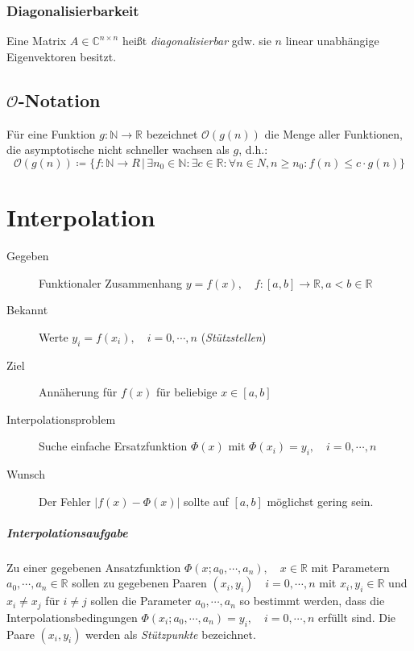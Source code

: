 \documentclass[a4paper, 11pt, accentcolor = tud3b]{tudreport}
\newcommand{\forwhich}{\ensuremath{{\,\vert\,}}}
\newcommand{\abs}[1]{\ensuremath{{\lvert #1 \rvert}}}
\newcommand{\C}{\ensuremath{\mathbb{C}}}
\newcommand{\R}{\ensuremath{\mathbb{R}}}
\newcommand{\N}{\ensuremath{\mathbb{N}}}
\begin{document}
	        \subsection{Diagonalisierbarkeit}
	            Eine Matrix \( A \in \C^{n \times n} \) heißt \textit{diagonalisierbar} gdw. sie \(n\) linear unabhängige Eigenvektoren besitzt.
	    
	    \section{\(\mathcal{O}\)-Notation}
		    Für eine Funktion \( g : \N \rightarrow \R \) bezeichnet \( \mathcal{O}(g(n)) \) die Menge aller Funktionen, die asymptotische nicht schneller wachsen als \(g\), d.h.:
		    \begin{equation*}
			    \mathcal{O}(g(n)) \coloneqq \{ f : \N \rightarrow R \forwhich \exists n_0 \in \N : \exists c \in \R : \forall n \in N, n \geq n_0 : f(n) \leq c \cdot g(n) \}
		    \end{equation*}
	
	\chapter{Interpolation}
	    \begin{description}
	    	\item[Gegeben] Funktionaler Zusammenhang \( y = f(x), \quad f : [a, b] \rightarrow \R, a < b \in \R \)
	    	\item[Bekannt] Werte \( y_i = f(x_i), \quad i = 0, \cdots, n \) (\textit{Stützstellen})
	    	\item[Ziel] Annäherung für \(f(x)\) für beliebige \( x \in [a, b] \)
	    	\item[Interpolationsproblem] Suche einfache Ersatzfunktion \( \Phi(x) \) mit \( \Phi(x_i) = y_i, \quad i = 0, \cdots, n \)
	    	\item[Wunsch] Der Fehler \( \abs{f(x) - \Phi(x)} \) sollte auf \( [a, b] \) möglichst gering sein.
	    \end{description}
    
	    \paragraph{Interpolationsaufgabe}
		    Zu einer gegebenen Ansatzfunktion \( \Phi(x; a_0, \cdots, a_n), \quad x \in \R \) mit Parametern \( a_0, \cdots, a_n \in \R \) sollen zu gegebenen Paaren \( (x_i, y_i) \quad i = 0, \cdots, n \) mit \( x_i, y_i \in \R \) und \( x_i \neq x_j \) für \( i \neq j \) sollen die Parameter \( a_0, \cdots, a_n \) so bestimmt werden, dass die Interpolationsbedingungen \( \Phi(x_i; a_0, \cdots, a_n) = y_i, \quad i = 0, \cdots, n \) erfüllt sind. Die Paare \( (x_i, y_i) \) werden als \textit{Stützpunkte} bezeichnet.
	
\end{document}
